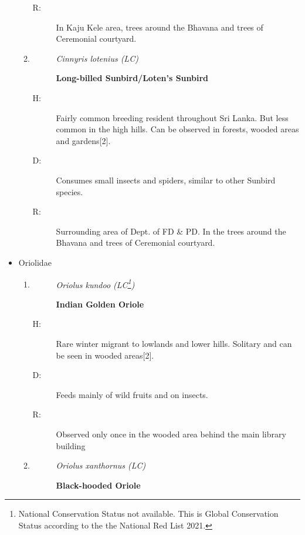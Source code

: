 \begin{itemize}
\begin{enumerate}
\begin{description}
\item[R: ]%
In Kaju Kele area, trees around the Bhavana and trees of Ceremonial courtyard. %
\end{description}%
\item%
\begin{description}%
\item[]%
\textit{Cinnyris lotenius (LC)}%
\item[]%
\textbf{Long{-}billed Sunbird/Loten's Sunbird}%
\end{description}%
\begin{description}%
\item[H: ]%
Fairly common breeding resident throughout Sri Lanka. But less common in the high hills. Can be observed in forests, wooded areas and gardens{[}2{]}.%
\item[D: ]%
Consumes small insects and spiders, similar to other Sunbird species.%
\item[R: ]%
Surrounding area of Dept. of FD \& PD. In the trees around the Bhavana and trees of Ceremonial courtyard.%
\end{description}%
\end{enumerate}%
\item%
Oriolidae%
\begin{enumerate}%
\item%
\begin{description}%
\item[]%
\textit{Oriolus kundoo (LC\footnote{National Conservation Status not available. This is Global Conservation Status according to the the National Red List 2021.})}%
\item[]%
\textbf{Indian Golden Oriole}%
\end{description}%
\begin{description}%
\item[H: ]%
Rare winter migrant to lowlands and lower hills. Solitary and can be seen in wooded areas{[}2{]}.%
\item[D: ]%
Feeds mainly of wild fruits and on insects. %
\item[R: ]%
Observed only once in the wooded area behind the main library building%
\end{description}%
\item%
\begin{description}%
\item[]%
\textit{Oriolus xanthornus (LC)}%
\item[]%
\textbf{Black{-}hooded Oriole}%
\end{description}%

\end{enumerate}
\end{itemize}
